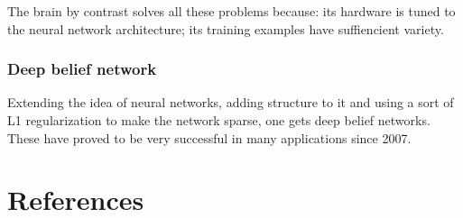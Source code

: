 \documentclass[oneside, article]{memoir}
\begin{document}
The brain by contrast solves all these problems because: its hardware is tuned to the neural network architecture; its training examples have suffiencient variety.

\section{Deep belief network}
Extending the idea of neural networks, adding structure to it and using a sort of L1 regularization to make the network sparse, one gets deep belief networks. These have proved to be very successful in many applications since 2007.

\tbc


\part{References}


\end{document}
